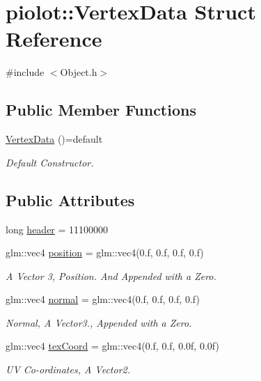 \hypertarget{structpiolot_1_1_vertex_data}{}\section{piolot\+:\+:Vertex\+Data Struct Reference}
\label{structpiolot_1_1_vertex_data}


{\ttfamily \#include $<$Object.\+h$>$}

\subsection*{Public Member Functions}
\begin{DoxyCompactItemize}
\item 
\mbox{\hyperlink{structpiolot_1_1_vertex_data_ab5710817488ea549782c284288dfe42b}{Vertex\+Data}} ()=default
\begin{DoxyCompactList}\small\item\em Default Constructor. \end{DoxyCompactList}\end{DoxyCompactItemize}
\subsection*{Public Attributes}
\begin{DoxyCompactItemize}
\item 
long \mbox{\hyperlink{structpiolot_1_1_vertex_data_a78e01f3bbe046b60050981d73418f65c}{header}} = 11100000
\item 
glm\+::vec4 \mbox{\hyperlink{structpiolot_1_1_vertex_data_aa2301ef8c411743410ea63808f5da434}{position}} = glm\+::vec4(0.f, 0.f, 0.f, 0.f)
\begin{DoxyCompactList}\small\item\em A Vector 3, Position. And Appended with a Zero. \end{DoxyCompactList}\item 
glm\+::vec4 \mbox{\hyperlink{structpiolot_1_1_vertex_data_acfb0b716a15091828ffb47dc07617460}{normal}} = glm\+::vec4(0.f, 0.f, 0.f, 0.f)
\begin{DoxyCompactList}\small\item\em Normal, A Vector3., Appended with a Zero. \end{DoxyCompactList}\item 
glm\+::vec4 \mbox{\hyperlink{structpiolot_1_1_vertex_data_ab3cf53f6a2dac9617bd2f39df13af149}{tex\+Coord}} = glm\+::vec4(0.f, 0.f, 0.\+0f, 0.\+0f)
\begin{DoxyCompactList}\small\item\em UV Co-\/ordinates, A Vector2. \end{DoxyCompactList}\end{DoxyCompactItemize}


